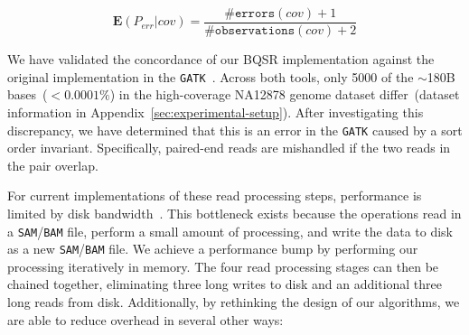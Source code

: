 \documentclass{sig-alternate}
\begin{document}
\begin{enumerate}
\begin{equation}
\label{eqn:bqsrerr}
\mathbf{E}(P_{err}|{cov}) = \frac{\texttt{\#errors}(cov) + 1}{\texttt{\#observations}(cov) + 2}
\end{equation}

We have validated the concordance of our BQSR implementation against the original implementation in the
\texttt{GATK}~\cite{depristo11}. Across both tools, only 5000
of the $\sim$180B bases~($<0.0001\%$) in the high-coverage \linebreak NA12878 genome dataset differ~(dataset
information in Appendix~\ref{sec:experimental-setup}). After investigating this discrepancy, we have determined that this is
an error in the \texttt{GATK} caused by a sort order invariant. Specifically, paired-end reads are mishandled if the two reads in the
pair overlap.
\end{enumerate}

For current implementations of these read processing steps, performance is limited by disk
bandwidth~\cite{diao15}. This bottleneck exists because the operations read in a \texttt{SAM}/\texttt{BAM} file, perform
a small amount of processing, and write the data to disk as a new \texttt{SAM}/\texttt{BAM} file. We achieve a
performance bump by performing our processing iteratively in memory. The four read processing stages
can then be chained together, eliminating three long writes to disk and an additional three long reads
from disk. Additionally, by rethinking the design of our algorithms, we are able to reduce overhead in
several other ways:
\end{document}
